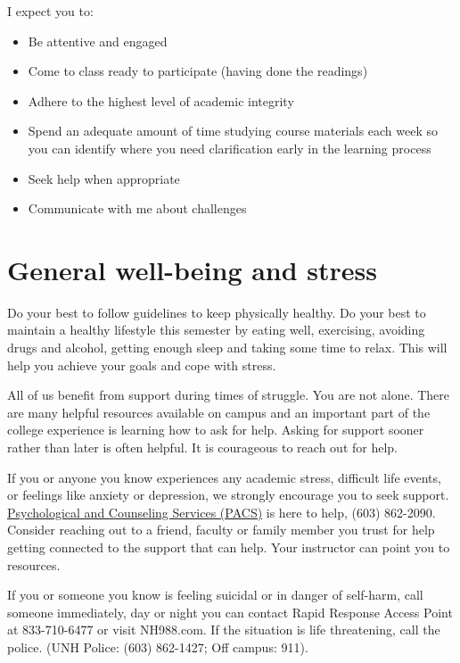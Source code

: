 \documentclass[
  letterpaper,
  DIV=11,
  numbers=noendperiod]{scrreprt}
\providecommand{\tightlist}{%
  \setlength{\itemsep}{0pt}\setlength{\parskip}{0pt}}\usepackage{longtable,booktabs,array}
\begin{document}
I expect you to:

\begin{itemize}
\tightlist
\item
  Be attentive and engaged
\item
  Come to class ready to participate (having done the readings)
\item
  Adhere to the highest level of academic integrity
\item
  Spend an adequate amount of time studying course materials each week
  so you can identify where you need clarification early in the learning
  process
\item
  Seek help when appropriate
\item
  Communicate with me about challenges
\end{itemize}

\hypertarget{general-well-being-and-stress}{%
\section*{General well-being and
stress}\label{general-well-being-and-stress}}


Do your best to follow guidelines to keep physically healthy. Do your
best to maintain a healthy lifestyle this semester by eating well,
exercising, avoiding drugs and alcohol, getting enough sleep and taking
some time to relax. This will help you achieve your goals and cope with
stress.

All of us benefit from support during times of struggle. You are not
alone. There are many helpful resources available on campus and an
important part of the college experience is learning how to ask for
help. Asking for support sooner rather than later is often helpful. It
is courageous to reach out for help.

If you or anyone you know experiences any academic stress, difficult
life events, or feelings like anxiety or depression, we strongly
encourage you to seek support.
\href{https://www.unh.edu/pacs/}{Psychological and Counseling Services
(PACS)} is here to help, (603) 862-2090. Consider reaching out to a
friend, faculty or family member you trust for help getting connected to
the support that can help. Your instructor can point you to resources.

If you or someone you know is feeling suicidal or in danger of
self-harm, call someone immediately, day or night you can contact Rapid
Response Access Point at 833-710-6477 or visit NH988.com. If the
situation is life threatening, call the police. (UNH Police: (603)
862-1427; Off campus: 911).
\end{document}
